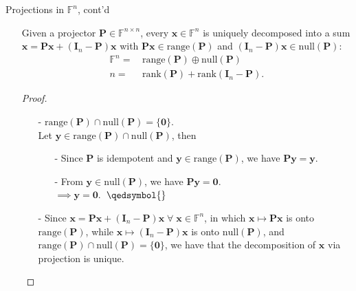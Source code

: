 \documentclass[t,usepdftitle=false]{beamer}
\begin{document}
\begin{frame}{Projections in $\mathbb{F}^n$, cont'd}
\begin{itemize}\item[]
\begin{theorem}
Given a projector $\mathbf{P}\in\mathbb{F}^{n\times n}$, every $\mathbf{x}\in\mathbb{F}^n$ is uniquely decomposed into a sum $\mathbf{x}=\mathbf{P}\mathbf{x}+(\mathbf{I}_n-\mathbf{P})\mathbf{x}$ with $\mathbf{P}\mathbf{x}\in\mathrm{range}(\mathbf{P})$
and
$(\mathbf{I}_n-\mathbf{P})\mathbf{x}\in\mathrm{null}(\mathbf{P})$:\vspace{-.25cm}
\begin{align*}
\mathbb{F}^n=&\,\mathrm{range}(\mathbf{P})\oplus\mathrm{null}(\mathbf{P})\\
n=&\,\mathrm{rank}(\mathbf{P})+\mathrm{rank}(\mathbf{I}_n-\mathbf{P}).
\end{align*}
\end{theorem}
\begin{proof}
\begin{itemize}
\item[-] $\mathrm{range}(\mathbf{P})\cap\mathrm{null}(\mathbf{P})=\{\mathbf{0}\}$.\vspace{.08cm}\\
Let $\mathbf{y}\in\mathrm{range}(\mathbf{P})\cap\mathrm{null}(\mathbf{P})$, then\vspace{-.1cm}
\begin{itemize}
\item[-] Since $\mathbf{P}$ is idempotent and $\mathbf{y}\in\mathrm{range}(\mathbf{P})$, we have $\mathbf{P}\mathbf{y}=\mathbf{y}$.\vspace{.08cm}
\item[-] From $\mathbf{y}\in\mathrm{null}(\mathbf{P})$, we have $\mathbf{P}\mathbf{y}=\mathbf{0}$.\vspace{.08cm}\\
$\implies\mathbf{y}=\mathbf{0}$.$\;\;\qedsymbol{}$
\end{itemize}
\vspace{-.18cm}
\item[-] Since $\mathbf{x}=\mathbf{P}\mathbf{x}+(\mathbf{I}_n-\mathbf{P})\mathbf{x}\;\forall\;\mathbf{x}\in\mathbb{F}^n$, in which $\mathbf{x}\mapsto\mathbf{P}\mathbf{x}$ is onto $\mathrm{range}(\mathbf{P})$, while
$\mathbf{x}\mapsto(\mathbf{I}_n-\mathbf{P})\mathbf{x}$ is onto $\mathrm{null}(\mathbf{P})$,
and $\mathrm{range}(\mathbf{P})\cap\mathrm{null}(\mathbf{P})=\{\mathbf{0}\}$,
we have that the decomposition of $\mathbf{x}$ via projection is unique.\vspace{-.25cm}
\end{itemize}
\end{proof}
\end{itemize}
\end{frame}
\end{document}
